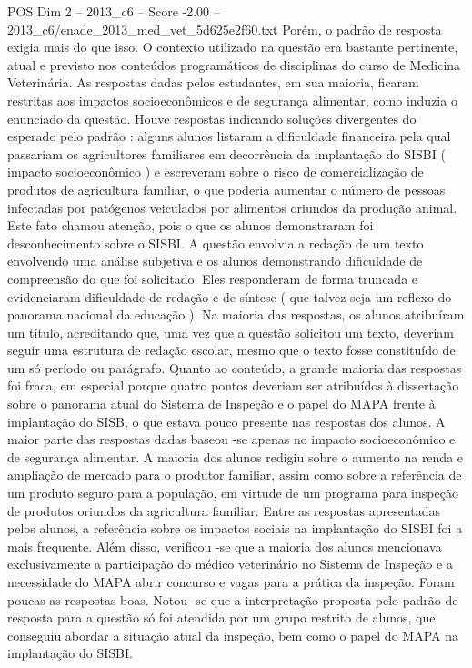 \begin{textsample}{POS Dim 2 – 2013\_c6 – Score -2.00 – 2013\_c6/enade\_2013\_med\_vet\_5d625e2f60.txt}
Porém, o padrão de resposta exigia mais do que isso.
O contexto utilizado na questão era bastante pertinente, atual e previsto nos conteúdos programáticos de disciplinas do curso de Medicina Veterinária.
As respostas dadas pelos estudantes, em sua maioria, ficaram restritas aos impactos socioeconômicos e de segurança alimentar, como induzia o enunciado da questão.
Houve respostas indicando soluções divergentes do esperado pelo padrão : alguns alunos listaram a dificuldade financeira pela qual passariam os agricultores familiares em decorrência da implantação do SISBI ( impacto socioeconômico ) e escreveram sobre o risco de comercialização de produtos de agricultura familiar, o que poderia aumentar o número de pessoas infectadas por patógenos veiculados por alimentos oriundos da produção animal.
Este fato chamou atenção, pois o que os alunos demonstraram foi desconhecimento sobre o SISBI.
A questão envolvia a redação de um texto envolvendo uma análise subjetiva e os alunos demonstrando dificuldade de compreensão do que foi solicitado.
Eles responderam de forma truncada e evidenciaram dificuldade de redação e de síntese ( que talvez seja um reflexo do panorama nacional da educação ).
Na maioria das respostas, os alunos atribuíram um título, acreditando que, uma vez que a questão solicitou um texto, deveriam seguir uma estrutura de redação escolar, mesmo que o texto fosse constituído de um só período ou parágrafo.
Quanto ao conteúdo, a grande maioria das respostas foi fraca, em especial porque quatro pontos deveriam ser atribuídos à dissertação sobre o panorama atual do Sistema de Inspeção e o papel do MAPA frente à implantação do SISB, o que estava pouco presente nas respostas dos alunos.
A maior parte das respostas dadas baseou -se apenas no impacto socioeconômico e de segurança alimentar.
A maioria dos alunos redigiu sobre o aumento na renda e ampliação de mercado para o produtor familiar, assim como sobre a referência de um produto seguro para a população, em virtude de um programa para inspeção de produtos oriundos da agricultura familiar.
Entre as respostas apresentadas pelos alunos, a referência sobre os impactos sociais na implantação do SISBI foi a mais frequente.
Além disso, verificou -se que a maioria dos alunos mencionava exclusivamente a participação do médico veterinário no Sistema de Inspeção e a necessidade do MAPA abrir concurso e vagas para a prática da inspeção.
Foram poucas as respostas boas.
Notou -se que a interpretação proposta pelo padrão de resposta para a questão só foi atendida por um grupo restrito de alunos, que conseguiu abordar a situação atual da inspeção, bem como o papel do MAPA na implantação do SISBI.

\end{textsample}
